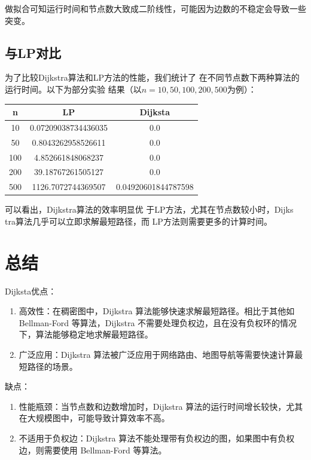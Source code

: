 \documentclass[10pt,a4paper,oneside]{article}
\begin{document}
做拟合可知运行时间和节点数大致成二阶线性，可能因为边数的不稳定会导致一些突变。

\subsection{与LP对比}
为了比较Dijkstra算法和LP方法的性能，我们统计了
在不同节点数下两种算法的运行时间。以下为部分实验
结果（以$n=10, 50, 100, 200, 500$为例）：
\begin{table}[H]
    \centering
    \begin{tabular}{|c|c|c|}
        \hline
        n & LP & Dijksta\\
        \hline
        10 &0.07209038734436035 &0.0 \\
        \hline
        50 &0.8043262958526611 & 0.0\\
        \hline
        100 &4.852661848068237 &0.0 \\
        \hline
        200 &39.18767261505127&0.0\\
        \hline
        500& 1126.7072744369507&0.04920601844787598\\
        \hline
    \end{tabular}
\end{table}
可以看出，Dijkstra算法的效率明显优
于LP方法，尤其在节点数较小时，Dijks
tra算法几乎可以立即求解最短路径，而
LP方法则需要更多的计算时间。

\section{总结}

Dijksta优点：
\begin{enumerate}
    \item 高效性：在稠密图中，Dijkstra 算法能够快速求解最短路径。相比于其他如 Bellman-Ford 等算法，Dijkstra 不需要处理负权边，且在没有负权环的情况下，算法能够稳定地求解最短路径。
    \item 广泛应用：Dijkstra 算法被广泛应用于网络路由、地图导航等需要快速计算最短路径的场景。
\end{enumerate}

缺点：
\begin{enumerate}
    \item 性能瓶颈：当节点数和边数增加时，Dijkstra 算法的运行时间增长较快，尤其在大规模图中，可能导致计算效率不高。
    \item 不适用于负权边：Dijkstra 算法不能处理带有负权边的图，如果图中有负权边，则需要使用 Bellman-Ford 等算法。
\end{enumerate}
\end{document}
